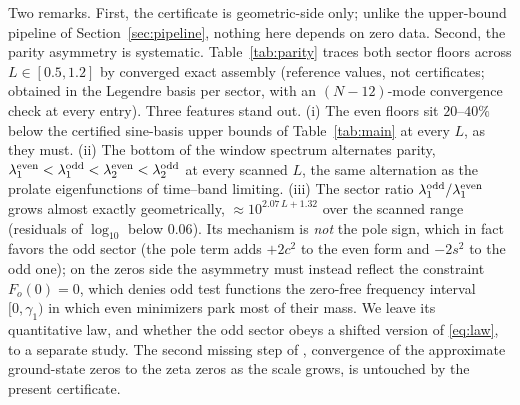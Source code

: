 ﻿\documentclass[11pt]{article}
\begin{document}
Two remarks.  First, the certificate is geometric-side only; unlike
the upper-bound pipeline of Section~\ref{sec:pipeline}, nothing here
depends on zero data.  Second, the parity asymmetry is systematic.
Table~\ref{tab:parity} traces both sector floors across
$L\in[0.5,1.2]$ by converged exact assembly (reference values, not
certificates; obtained in the Legendre basis per sector, with an
$(N{-}12)$-mode convergence check at every entry).  Three features
stand out.  (i) The even floors sit $20$--$40\%$ below the certified
sine-basis upper bounds of Table~\ref{tab:main} at every $L$, as they
must.  (ii) The bottom of the window spectrum alternates parity,
$\lambda_1^{\rm even}<\lambda_1^{\rm odd}<\lambda_2^{\rm even}
<\lambda_2^{\rm odd}$ at every scanned $L$, the same alternation as
the prolate eigenfunctions of time--band limiting.  (iii) The sector
ratio $\lambda_1^{\rm odd}/\lambda_1^{\rm even}$ grows almost exactly
geometrically, $\approx10^{2.07\,L+1.32}$ over the scanned range
(residuals of $\log_{10}$ below $0.06$).  Its mechanism is \emph{not}
the pole sign, which in fact favors the odd sector (the pole term
adds $+2c^2$ to the even form and $-2s^2$ to the odd one); on the
zeros side the asymmetry must instead reflect the constraint
$F_o(0)=0$, which denies odd test functions the zero-free frequency
interval $[0,\gamma_1)$ in which even minimizers park most of their
mass.  We leave its quantitative law, and whether the odd sector
obeys a shifted version of \eqref{eq:law}, to a separate study.  The
second missing step of \cite{CCMZeta2025}, convergence of the
approximate ground-state zeros to the zeta zeros as the scale grows,
is untouched by the present certificate.
\end{document}
